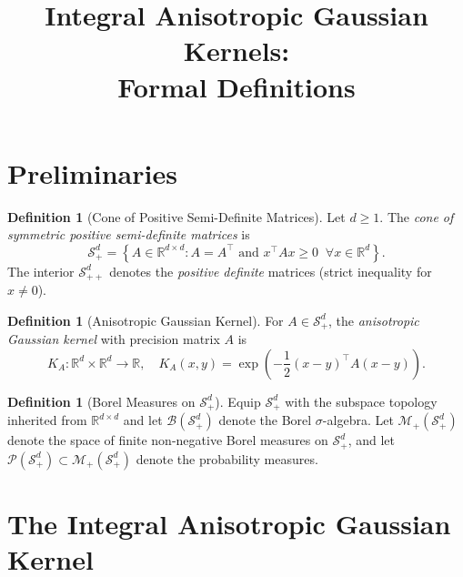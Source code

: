 \documentclass[11pt]{article}
\title{Integral Anisotropic Gaussian Kernels:\\Formal Definitions}
\author{}
\date{}
\theoremstyle{definition}
\newtheorem{definition}[theorem]{Definition}
\newcommand{\R}{\mathbb{R}}
\newcommand{\Splus}{\mathcal{S}_+^d}
\newcommand{\Splusplus}{\mathcal{S}_{++}^d}
\newcommand{\B}{\mathcal{B}}
\newcommand{\M}{\mathcal{M}}
\begin{document}
\maketitle

\section{Preliminaries}

\begin{definition}[Cone of Positive Semi-Definite Matrices]
Let $d \geq 1$. The \emph{cone of symmetric positive semi-definite matrices} is
\begin{equation}
    \Splus = \left\{ A \in \R^{d \times d} : A = A^\top \text{ and } x^\top A x \geq 0 \;\; \forall x \in \R^d \right\}.
\end{equation}
The interior $\Splusplus$ denotes the \emph{positive definite} matrices (strict inequality for $x \neq 0$).
\end{definition}

\begin{definition}[Anisotropic Gaussian Kernel]
For $A \in \Splus$, the \emph{anisotropic Gaussian kernel} with precision matrix $A$ is
\begin{equation}
    K_A: \R^d \times \R^d \to \R, \quad K_A(x, y) = \exp\left( -\frac{1}{2}(x-y)^\top A (x-y) \right).
\end{equation}
\end{definition}

\begin{definition}[Borel Measures on $\Splus$]
Equip $\Splus$ with the subspace topology inherited from $\R^{d \times d}$ and let $\B(\Splus)$ denote the Borel $\sigma$-algebra. Let $\M_+(\Splus)$ denote the space of finite non-negative Borel measures on $\Splus$, and let $\mathcal{P}(\Splus) \subset \M_+(\Splus)$ denote the probability measures.
\end{definition}

\section{The Integral Anisotropic Gaussian Kernel}
\end{document}
